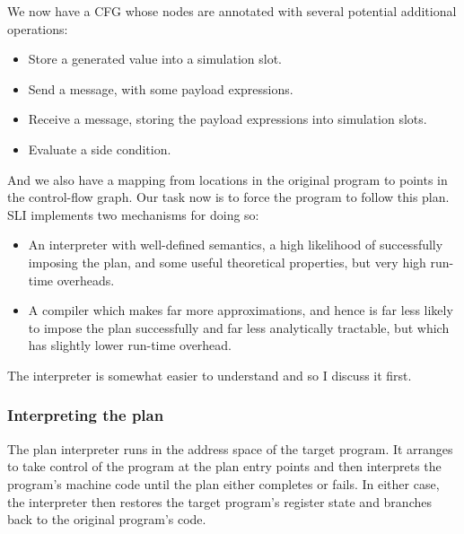 We now have a CFG whose nodes are annotated with several potential additional operations:

\begin{itemize}
\item Store a generated value into a simulation slot.
\item Send a message, with some payload expressions.
\item Receive a message, storing the payload expressions into simulation slots.
\item Evaluate a side condition.
\end{itemize}

And we also have a mapping from locations in the original program to points in the control-flow graph.
Our task now is to force the program to follow this plan.
SLI implements two mechanisms for doing so:

\begin{itemize}
\item
  An interpreter with well-defined semantics, a high likelihood of successfully imposing the plan, and some useful theoretical properties, but very high run-time overheads.
\item
  A compiler which makes far more approximations, and hence is far less likely to impose the plan successfully and far less analytically tractable, but which has slightly lower run-time overhead.
\end{itemize}

The interpreter is somewhat easier to understand and so I discuss it first.

\subsubsection{Interpreting the plan}
\label{sect:enforce:interpreting}

The plan interpreter runs in the address space of the target program.
It arranges to take control of the program at the plan entry points and then interprets the program's machine code until the plan either completes or fails.
In either case, the interpreter then restores the target program's register state and branches back to the original program's code.



